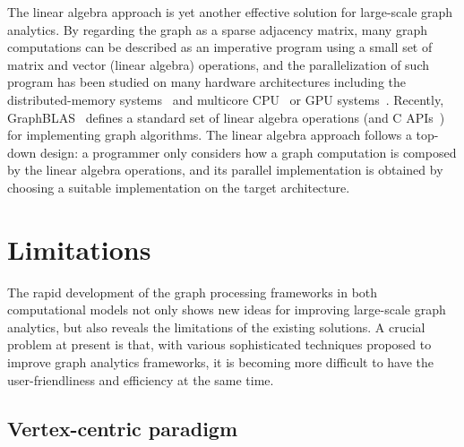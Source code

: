 \documentclass{sokendai_thesis} %
\begin{document}
The linear algebra approach is yet another effective solution for large-scale graph analytics.
By regarding the graph as a sparse adjacency matrix, many graph computations can be described as an imperative program using a small set of matrix and vector (linear algebra) operations, and the parallelization of such program has been studied on many hardware architectures including the distributed-memory systems~\cite{combblas} and multicore CPU~\cite{graphblas} or GPU systems~\cite{yang2019graphblast}.
Recently, GraphBLAS~\cite{graphblas} defines a standard set of linear algebra operations (and C APIs~\cite{graphblas-C}) for implementing graph algorithms.
The linear algebra approach follows a top-down design: a programmer only considers how a graph computation is composed by the linear algebra operations, and its parallel implementation is obtained by choosing a suitable implementation on the target architecture.


\section{Limitations}

The rapid development of the graph processing frameworks in both computational models not only shows new ideas for improving large-scale graph analytics, but also reveals the limitations of the existing solutions.
A crucial problem at present is that, with various sophisticated techniques proposed to improve graph analytics frameworks, it is becoming more difficult to have the user-friendliness and efficiency at the same time.

\subsection{Vertex-centric paradigm}
\end{document}
